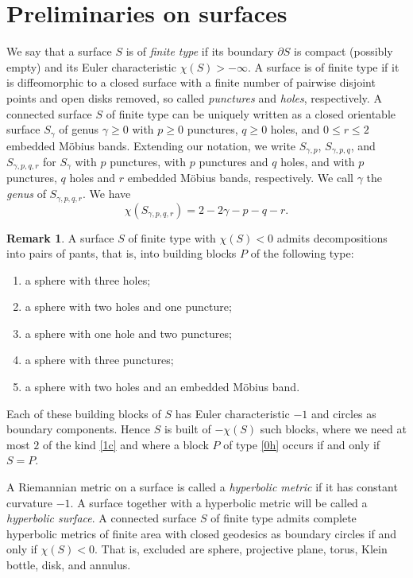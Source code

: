 \documentclass[a4paper,11pt]{amsart}
\numberwithin{equation}{section}
\theoremstyle{definition}
\newtheorem{rem}[equation]{Remark}
\begin{document}
\section{Preliminaries on surfaces}
\label{secsu}
We say that a surface $S$ is of \emph{finite type} if its boundary $\partial S$ is compact (possibly empty) and its Euler characteristic $\chi(S)>-\infty$.
A surface is of finite type if it is diffeomorphic to a closed surface with a finite number of pairwise disjoint points and open disks removed, so called \emph{punctures} and \emph{holes}, respectively.
A connected surface $S$ of finite type can be uniquely written as a closed orientable surface $S_\gamma$ of genus $\gamma\ge0$ with $p\ge0$ punctures, $q\ge0$ holes, and $0\le r\le2$ embedded M\"obius bands.
Extending our notation, we write $S_{\gamma, p}$, $S_{\gamma, p, q}$, and $S_{\gamma, p, q, r}$ for $S_\gamma$ with $p$ punctures, with $p$ punctures and $q$ holes, and with $p$ punctures, $q$ holes and $r$ embedded M\"obius bands, respectively.
We call $\gamma$ the \emph{genus} of $S_{\gamma,p,q,r}$.
We have \[\chi(S_{\gamma,p,q,r})=2-2\gamma-p-q-r.\]

\begin{rem}\label{pp}
A surface $S$ of finite type with $\chi(S)<0$ admits decompositions into pairs of pants, that is, into building blocks $P$ of the following type:
\begin{enumerate}[label=\arabic*)]
\item\label{3h} a sphere with three holes;
\item\label{2h} a sphere with two holes and one puncture;
\item\label{1h} a sphere with one hole and two punctures; 
\item\label{0h} a sphere with three punctures;
\item\label{1c} a sphere with two holes and an embedded M\"obius band.
\end{enumerate}
Each of these building blocks of $S$ has Euler characteristic $-1$ and circles as boundary components.
Hence $S$ is built of $-\chi(S)$ such blocks, where we need at most $2$ of the kind \ref{1c}
and where a block $P$ of type \ref{0h} occurs if and only if $S=P$. 
\end{rem} 

A Riemannian metric on a surface is called a \emph{hyperbolic metric} if it has constant curvature $-1$.
A surface together with a hyperbolic metric will be called a \emph{hyperbolic surface}.
A connected surface $S$ of finite type admits complete hyperbolic metrics of finite area with closed geodesics as boundary circles if and only if $\chi(S)<0$.
That is, excluded are sphere, projective plane, torus, Klein bottle, disk, and annulus.
\end{document}
